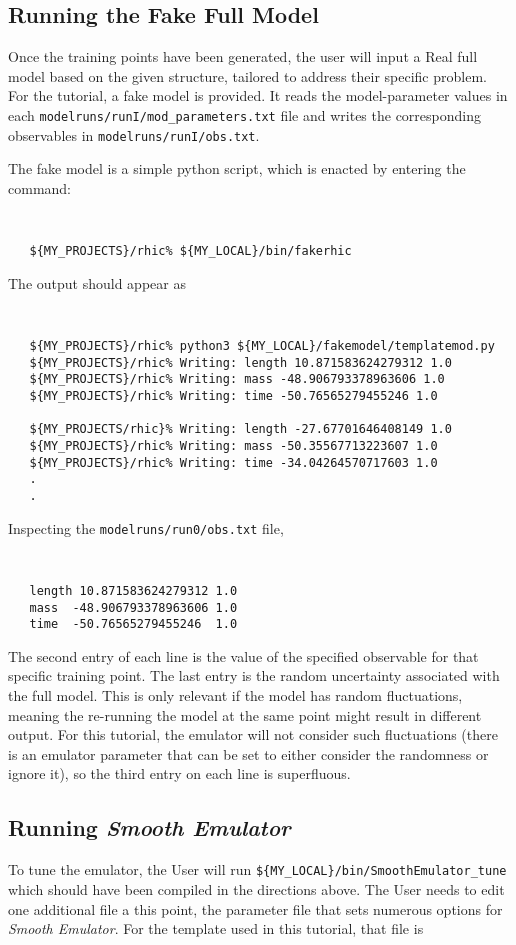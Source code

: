 \documentclass[UserManual.tex]{subfiles}
\begin{document}
\subsection{Running the Fake Full Model}
Once the training points have been generated, the user will input a Real full model based on the given structure, tailored to address their specific problem. For the tutorial, a fake model is provided. It reads the model-parameter values in each {\tt modelruns/runI/mod\_parameters.txt} file and writes the corresponding observables in {\tt modelruns/runI/obs.txt}. 

The fake model is a simple python script, which is enacted by entering the command:

{\tt
\begin{verbatim}
   ${MY_PROJECTS}/rhic% ${MY_LOCAL}/bin/fakerhic
\end{verbatim}
}
The output should appear as

{\tt
\begin{verbatim}
   ${MY_PROJECTS}/rhic% python3 ${MY_LOCAL}/fakemodel/templatemod.py
   ${MY_PROJECTS}/rhic% Writing: length 10.871583624279312 1.0
   ${MY_PROJECTS}/rhic% Writing: mass -48.906793378963606 1.0
   ${MY_PROJECTS}/rhic% Writing: time -50.76565279455246 1.0

   ${MY_PROJECTS/rhic}% Writing: length -27.67701646408149 1.0
   ${MY_PROJECTS}/rhic% Writing: mass -50.35567713223607 1.0
   ${MY_PROJECTS}/rhic% Writing: time -34.04264570717603 1.0
   .
   .
\end{verbatim}
}
Inspecting the {\tt modelruns/run0/obs.txt} file,

{\tt
\begin{verbatim}
   length 10.871583624279312 1.0
   mass  -48.906793378963606 1.0
   time  -50.76565279455246  1.0
\end{verbatim}
}
The second entry of each line is the value of the specified observable for that specific training point. The last entry is the random uncertainty associated with the full model. This is only relevant if the model has random fluctuations, meaning the re-running the model at the same point might result in different output. For this tutorial, the emulator will not consider such fluctuations (there is an emulator parameter that can be set to either consider the randomness or ignore it), so the third entry on each line is superfluous.

\subsection{Running {\it Smooth Emulator}}
To tune the emulator, the User will run {\tt \$\{MY\_LOCAL\}/bin/SmoothEmulator\_tune} which should have been compiled in the directions above. The User needs to edit one additional file a this point, the parameter file that sets numerous options for {\it Smooth Emulator}. For the template used in this tutorial, that file is
\end{document}
